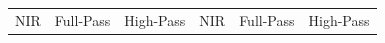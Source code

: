 \begin{figure}[htp!]
    \centering
    \begin{tabularx}{\textwidth}{Y Y Y !{\space} Y Y Y}
        NIR                                                                                               & Full-Pass                                                                                               & High-Pass                                                                                               & NIR                                                                                               & Full-Pass                                                                                               & High-Pass                                                                                               \\

\end{tabularx}
\end{figure}
